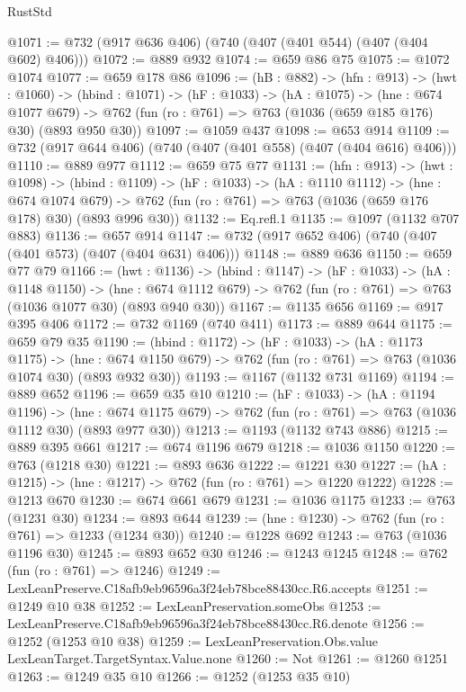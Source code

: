 \begin{lexlean}{RustStd}
\begin{coremodule}
@1071 := @732 (@917 @636 @406) (@740 (@407 (@401 @544) (@407 (@404 @602) @406)))
@1072 := @889 @932
@1074 := @659 @86 @75
@1075 := @1072 @1074
@1077 := @659 @178 @86
@1096 := (hB : @882) ->
  (hfn : @913) ->
  (hwt : @1060) ->
  (hbind : @1071) ->
  (hF : @1033) ->
  (hA : @1075) ->
  (hne : @674 @1077 @679) ->
  @762 (fun (ro : @761) => @763 (@1036 (@659 @185 @176) @30) (@893 @950 @30))
@1097 := @1059 @437
@1098 := @653 @914
@1109 := @732 (@917 @644 @406) (@740 (@407 (@401 @558) (@407 (@404 @616) @406)))
@1110 := @889 @977
@1112 := @659 @75 @77
@1131 := (hfn : @913) ->
  (hwt : @1098) ->
  (hbind : @1109) ->
  (hF : @1033) ->
  (hA : @1110 @1112) ->
  (hne : @674 @1074 @679) ->
  @762 (fun (ro : @761) => @763 (@1036 (@659 @176 @178) @30) (@893 @996 @30))
@1132 := Eq.refl.{1}
@1135 := @1097 (@1132 @707 @883)
@1136 := @657 @914
@1147 := @732 (@917 @652 @406) (@740 (@407 (@401 @573) (@407 (@404 @631) @406)))
@1148 := @889 @636
@1150 := @659 @77 @79
@1166 := (hwt : @1136) ->
  (hbind : @1147) ->
  (hF : @1033) ->
  (hA : @1148 @1150) ->
  (hne : @674 @1112 @679) -> @762 (fun (ro : @761) => @763 (@1036 @1077 @30) (@893 @940 @30))
@1167 := @1135 @656
@1169 := @917 @395 @406
@1172 := @732 @1169 (@740 @411)
@1173 := @889 @644
@1175 := @659 @79 @35
@1190 := (hbind : @1172) ->
  (hF : @1033) ->
  (hA : @1173 @1175) ->
  (hne : @674 @1150 @679) -> @762 (fun (ro : @761) => @763 (@1036 @1074 @30) (@893 @932 @30))
@1193 := @1167 (@1132 @731 @1169)
@1194 := @889 @652
@1196 := @659 @35 @10
@1210 := (hF : @1033) ->
  (hA : @1194 @1196) ->
  (hne : @674 @1175 @679) -> @762 (fun (ro : @761) => @763 (@1036 @1112 @30) (@893 @977 @30))
@1213 := @1193 (@1132 @743 @886)
@1215 := @889 @395 @661
@1217 := @674 @1196 @679
@1218 := @1036 @1150
@1220 := @763 (@1218 @30)
@1221 := @893 @636
@1222 := @1221 @30
@1227 := (hA : @1215) -> (hne : @1217) -> @762 (fun (ro : @761) => @1220 @1222)
@1228 := @1213 @670
@1230 := @674 @661 @679
@1231 := @1036 @1175
@1233 := @763 (@1231 @30)
@1234 := @893 @644
@1239 := (hne : @1230) -> @762 (fun (ro : @761) => @1233 (@1234 @30))
@1240 := @1228 @692
@1243 := @763 (@1036 @1196 @30)
@1245 := @893 @652 @30
@1246 := @1243 @1245
@1248 := @762 (fun (ro : @761) => @1246)
@1249 := LexLeanPreserve.C18afb9eb96596a3f24eb78bce88430cc.R6.accepts
@1251 := @1249 @10 @38
@1252 := LexLeanPreservation.someObs
@1253 := LexLeanPreserve.C18afb9eb96596a3f24eb78bce88430cc.R6.denote
@1256 := @1252 (@1253 @10 @38)
@1259 := LexLeanPreservation.Obs.value LexLeanTarget.TargetSyntax.Value.none
@1260 := Not
@1261 := @1260 @1251
@1263 := @1249 @35 @10
@1266 := @1252 (@1253 @35 @10)

\end{coremodule}
\end{lexlean}
